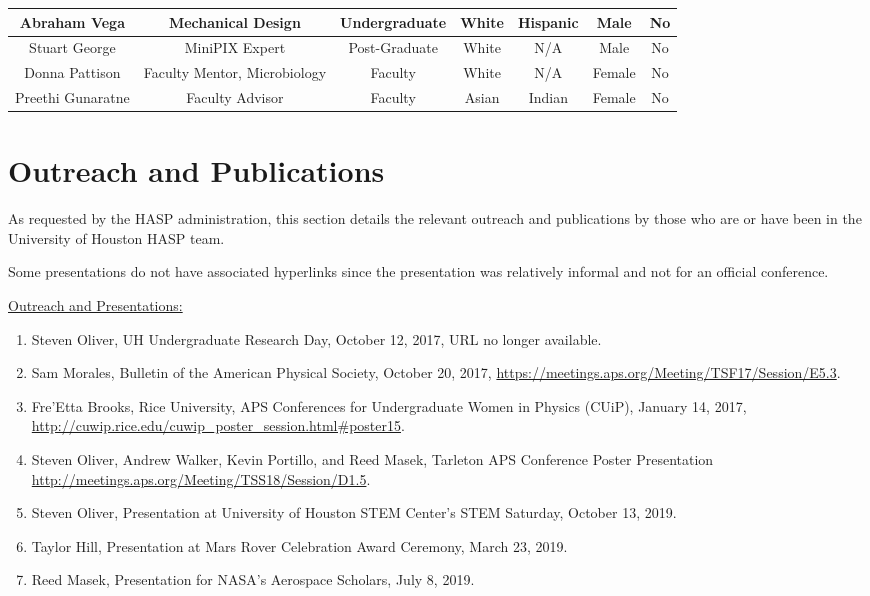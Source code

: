 \begin{appendices}
\begin{table}[h!]
\begin{tabular}  {ccccccc}
      Abraham Vega & Mechanical Design & Undergraduate & White & Hispanic & Male & No \\ \hline
	  Stuart George & MiniPIX Expert & Post-Graduate & White & N/A & Male & No \\ \hline
	  Donna Pattison & Faculty Mentor, Microbiology & Faculty & White & N/A & Female & No \\ \hline
	  Preethi Gunaratne & Faculty Advisor & Faculty & Asian & Indian & Female & No \\ \hline
	\end{tabular}	
  \end{table}  

  \section{Outreach and Publications}
  \noindent As requested by the HASP administration, this section details the relevant outreach and publications by those who are or have been in the University of Houston HASP team.

  \noindent Some presentations do not have associated hyperlinks since the presentation was relatively informal and not for an official conference. 

  \vspace{0.25cm}
  \noindent\underline{Outreach and Presentations:}
  \begin{enumerate}[leftmargin=3\parindent]
    \item Steven Oliver, UH Undergraduate Research Day, October 12, 2017, URL no longer available.
  \item Sam Morales, Bulletin of the American Physical Society, October 20, 2017, \url{https://meetings.aps.org/Meeting/TSF17/Session/E5.3}.
  \item Fre'Etta Brooks, Rice University, APS Conferences for Undergraduate Women in Physics (CUiP), January 14, 2017, \url{http://cuwip.rice.edu/cuwip_poster_session.html#poster15}.
  \item Steven Oliver, Andrew Walker, Kevin Portillo, and Reed Masek, Tarleton APS Conference Poster Presentation \url{http://meetings.aps.org/Meeting/TSS18/Session/D1.5}.
  \item Steven Oliver, Presentation at University of Houston STEM Center's STEM Saturday, October 13, 2019.
  \item Taylor Hill, Presentation at Mars Rover Celebration Award Ceremony, March 23, 2019.
  \item Reed Masek, Presentation for NASA's Aerospace Scholars, July 8, 2019.
  \end{enumerate}


\end{appendices}
